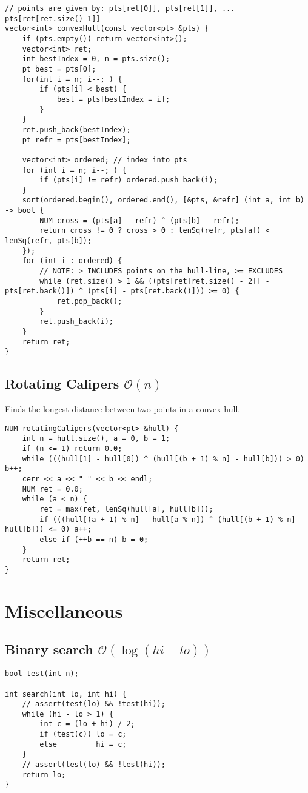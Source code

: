 \documentclass{article}
\begin{document}
\begin{lstlisting}
// points are given by: pts[ret[0]], pts[ret[1]], ... pts[ret[ret.size()-1]]
vector<int> convexHull(const vector<pt> &pts) {
	if (pts.empty()) return vector<int>();
	vector<int> ret;
	int bestIndex = 0, n = pts.size();
	pt best = pts[0];
	for(int i = n; i--; ) {
		if (pts[i] < best) {
			best = pts[bestIndex = i];
		}
	}
	ret.push_back(bestIndex);
	pt refr = pts[bestIndex];

	vector<int> ordered; // index into pts
	for (int i = n; i--; ) {
		if (pts[i] != refr) ordered.push_back(i);
	}
	sort(ordered.begin(), ordered.end(), [&pts, &refr] (int a, int b) -> bool {
		NUM cross = (pts[a] - refr) ^ (pts[b] - refr);
		return cross != 0 ? cross > 0 : lenSq(refr, pts[a]) < lenSq(refr, pts[b]);
	});
	for (int i : ordered) {
		// NOTE: > INCLUDES points on the hull-line, >= EXCLUDES
		while (ret.size() > 1 && ((pts[ret[ret.size() - 2]] - pts[ret.back()]) ^ (pts[i] - pts[ret.back()])) >= 0) {
			ret.pop_back();
		}
		ret.push_back(i);
	}
	return ret;
}
\end{lstlisting}

\subsection{Rotating Calipers $\mathcal{O}(n)$}

Finds the longest distance between two points in a convex hull.

\begin{lstlisting}
NUM rotatingCalipers(vector<pt> &hull) {
    int n = hull.size(), a = 0, b = 1;
    if (n <= 1) return 0.0;
    while (((hull[1] - hull[0]) ^ (hull[(b + 1) % n] - hull[b])) > 0) b++;
    cerr << a << " " << b << endl;
    NUM ret = 0.0;
    while (a < n) {
        ret = max(ret, lenSq(hull[a], hull[b]));
        if (((hull[(a + 1) % n] - hull[a % n]) ^ (hull[(b + 1) % n] - hull[b])) <= 0) a++;
        else if (++b == n) b = 0;
    }
    return ret;
}
\end{lstlisting}

\section{Miscellaneous}
\subsection{Binary search $\mathcal{O}(\log (hi - lo))$}

\begin{lstlisting}
bool test(int n);

int search(int lo, int hi) {
	// assert(test(lo) && !test(hi));
	while (hi - lo > 1) {
		int c = (lo + hi) / 2;
		if (test(c)) lo = c;
		else         hi = c;
	}
	// assert(test(lo) && !test(hi));
	return lo;
}
\end{lstlisting}
\end{document}
